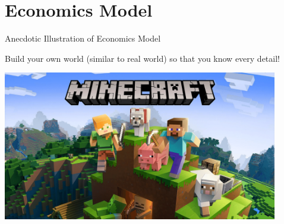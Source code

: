 \documentclass[11pt,aspectratio=43,usenames,dvipsnames]{beamer}
\theoremstyle{definition}
\begin{document}
\section[EconModel]{Economics Model}
\label{sec:Economics_Model}

\begin{frame}{Anecdotic Illustration of Economics Model}
\label{slide:Anecdotic_Illustration_of_Economics_Model}

Build your own world (similar to real world) so that you know every detail!

\begin{center}
\includegraphics[width=0.9\textwidth]{./figures/6375692be499513c6f3be825_Minecraft-logo.png}
\end{center}

\end{frame}
\end{document}
